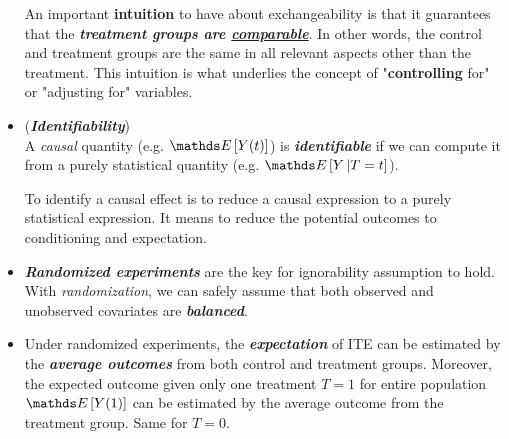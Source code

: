 \documentclass[11pt]{article}
\begin{document}
\begin{itemize}
An important \textbf{intuition} to have about exchangeability is that it guarantees that the \textbf{\emph{treatment groups are \underline{comparable}}}. In other words, the control and treatment groups are the same in all relevant aspects other than the treatment.  This intuition is what underlies the concept of "\textbf{controlling} for" or "adjusting for" variables.

\item 
\begin{definition}(\textbf{\emph{Identifiability}}) \citep{neal2020introduction}\\
 A \emph{causal} quantity (e.g. $\E{}{Y(t)}$) is \emph{\textbf{identifiable}} if we can compute it from a purely statistical quantity (e.g.  $\E{}{Y\,| T = t}$).
\end{definition} To identify a causal effect is to reduce a causal expression to a purely statistical expression. It means to reduce the potential outcomes to conditioning and expectation.

\item \textbf{\emph{Randomized experiments}} are the key for ignorability assumption to hold. With \emph{randomization}, we can safely assume that both observed and unobserved covariates are \emph{\textbf{balanced}}. 

\item Under randomized experiments, the \emph{\textbf{expectation}} of ITE can be estimated by the \emph{\textbf{average outcomes}} from both control and treatment groups. Moreover, the expected outcome given only one treatment $T=1$ for entire population $\E{}{Y(1)}$ can be estimated by the average outcome from the treatment group. Same for $T=0$.
\end{itemize}
\end{document}
